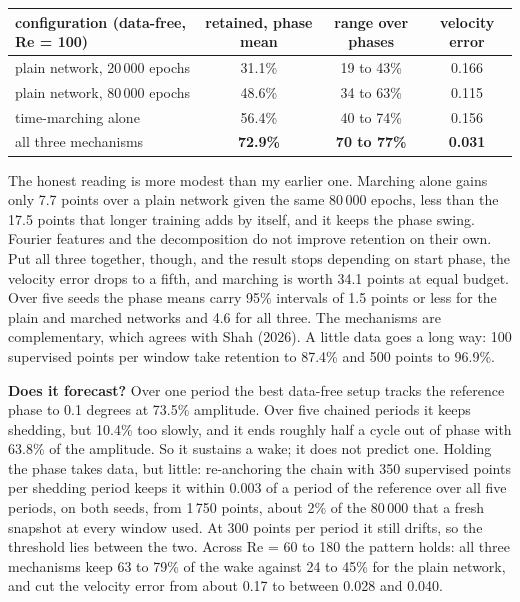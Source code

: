\documentclass[11pt,a4paper]{article}
\begin{document}
\begin{center}\small
\begin{tabular}{lccc}
\toprule
configuration (data-free, Re = 100) & retained, phase mean & range over phases & velocity error \\
\midrule
plain network, 20\,000 epochs        & 31.1\% & 19 to 43\% & 0.166 \\
plain network, 80\,000 epochs        & 48.6\% & 34 to 63\% & 0.115 \\
time-marching alone                  & 56.4\% & 40 to 74\% & 0.156 \\
all three mechanisms                 & \textbf{72.9\%} & \textbf{70 to 77\%} & \textbf{0.031} \\
\bottomrule
\end{tabular}
\end{center}

The honest reading is more modest than my earlier one. Marching alone gains
only 7.7 points over a plain network given the same 80\,000 epochs, less than
the 17.5 points that longer training adds by itself, and it keeps the phase
swing. Fourier features and the decomposition do not improve retention on
their own. Put all three together, though, and the result stops depending on
start phase, the velocity error drops to a fifth, and marching is worth 34.1
points at equal budget. Over five seeds the phase means carry 95\% intervals of
1.5 points or less for the plain and marched networks and 4.6 for all three. The mechanisms are complementary, which agrees with
Shah (2026). A little data goes a long way: 100 supervised points per window
take retention to 87.4\% and 500 points to 96.9\%.

\textbf{Does it forecast?} Over one period the best data-free setup tracks the
reference phase to 0.1 degrees at 73.5\% amplitude. Over five chained periods it
keeps shedding, but 10.4\% too slowly, and it ends roughly half a cycle out of
phase with 63.8\% of the amplitude. So it sustains a wake; it does not predict
one. Holding the phase takes data, but little: re-anchoring the chain with 350
supervised points per shedding period keeps it within 0.003 of a period of the
reference over all five periods, on both seeds, from 1\,750 points, about 2\% of
the 80\,000 that a fresh snapshot at every window used. At 300 points per period
it still drifts, so the threshold lies between the two. Across Re = 60 to 180 the pattern holds: all three mechanisms keep 63 to
79\% of the wake against 24 to 45\% for the plain network, and cut the velocity
error from about 0.17 to between 0.028 and 0.040.
\end{document}
